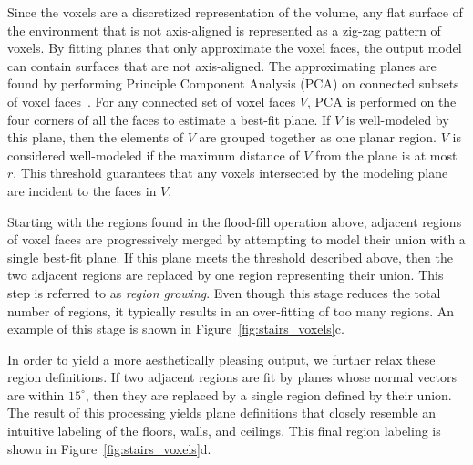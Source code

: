 \documentclass[10pt,twocolumn,letterpaper]{article}
\begin{document}
Since the voxels are a discretized representation of the volume, any flat surface of the environment that is not axis-aligned is represented as a zig-zag pattern of voxels.  By fitting planes that only approximate the voxel faces, the output model can contain surfaces that are not axis-aligned.  The approximating planes are found by performing Principle Component Analysis (PCA) on connected subsets of voxel faces~\cite{PCA}.  For any connected set of voxel faces $V$, PCA is performed on the four corners of all the faces to estimate a best-fit plane.  If $V$ is well-modeled by this plane, then the elements of $V$ are grouped together as one planar region.  $V$ is considered well-modeled if the maximum distance of $V$ from the plane is at most $r$.  This threshold guarantees that any voxels intersected by the modeling plane are incident to the faces in $V$.

Starting with the regions found in the flood-fill operation above, adjacent regions of voxel faces are progressively merged by attempting to model their union with a single best-fit plane.  If this plane meets the threshold described above, then the two adjacent regions are replaced by one region representing their union.  This step is referred to as {\it region growing}.  Even though this stage reduces the total number of regions, it typically results in an over-fitting of too many regions.  An example of this stage is shown in Figure~\ref{fig:stairs_voxels}c.

In order to yield a more aesthetically pleasing output, we further relax these region definitions.  If two adjacent regions are fit by planes whose normal vectors are within $15^{\circ}$, then they are replaced by a single region defined by their union.  The result of this processing yields plane definitions that closely resemble an intuitive labeling of the floors, walls, and ceilings.  This final region labeling is shown in Figure~\ref{fig:stairs_voxels}d. 
\end{document}
